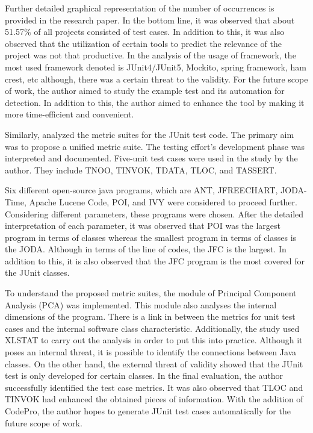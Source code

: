 Further detailed graphical representation of the number of occurrences is provided in the research paper. In the bottom line, it was observed that about 51.57\% of all projects consisted of test cases. In addition to this, it was also observed that the utilization of certain tools to predict the relevance of the project was not that productive. In the analysis of the usage of framework, the most used framework denoted is JUnit4/JUnit5, Mockito, spring framework, ham crest, etc although, there was a certain threat to the validity. For the future scope of work, the author aimed to study the example test and its automation for detection. In addition to this, the author aimed to enhance the tool by making it more time-efficient and convenient.\par 
Similarly, \cite{ref28} analyzed the metric suites for the JUnit test code. The primary aim was to propose a unified metric suite. The testing effort's development phase was interpreted and documented. Five-unit test cases were used in the study by the author. They include TNOO, TINVOK, TDATA, TLOC, and TASSERT.\par 
Six different open-source java programs, which are ANT, JFREECHART, JODA-Time, Apache Lucene Code, POI, and IVY were considered to proceed further. Considering different parameters, these programs were chosen. After the detailed interpretation of each parameter, it was observed that POI was the largest program in terms of classes whereas the smallest program in terms of classes is the JODA. Although in terms of the line of codes, the JFC is the largest. In addition to this, it is also observed that the JFC program is the most covered for the JUnit classes.\par 
To understand the proposed metric suites, the module of Principal Component Analysis (PCA) was implemented. This module also analyses the internal dimensions of the program. There is a link in between the metrics for unit test cases and the internal software class characteristic. Additionally, the study used XLSTAT to carry out the analysis in order to put this into practice. Although it poses an internal threat, it is possible to identify the connections between Java classes. On the other hand, the external threat of validity showed that the JUnit test is only developed for certain classes. In the final evaluation, the author successfully identified the test case metrics. It was also observed that TLOC and TINVOK had enhanced the obtained pieces of information. With the addition of CodePro, the author hopes to generate JUnit test cases automatically for the future scope of work.\par 
